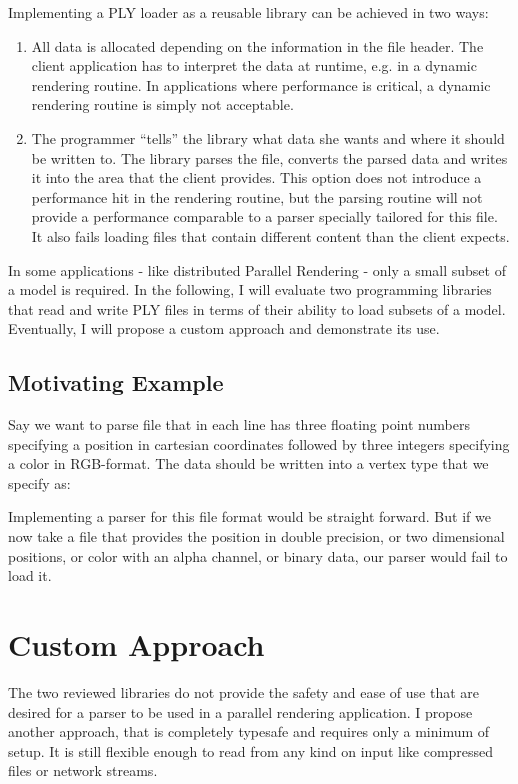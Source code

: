 \documentclass[a4paper,parskip=half,twocolumn]{scrartcl}
\begin{document}
Implementing a PLY loader as a reusable library can be achieved in two ways:
\begin{enumerate}
  \item All data is allocated depending on the information in the file header.
  The client application has to interpret the data at runtime, e.g. in a dynamic
  rendering routine. In applications where performance is critical, a dynamic
  rendering routine is simply not acceptable.
  \item The programmer ``tells'' the library what data she wants and where it
  should be written to. The library parses the file, converts the parsed data
  and writes it into the area that the client provides. This option does not
  introduce a performance hit in the rendering routine, but the parsing routine
  will not provide a performance comparable to a parser specially tailored for
  this file. It also fails loading files that contain different content than the
  client expects.
\end{enumerate}

In some applications - like distributed Parallel Rendering - only a small subset
of a model is required. In the following, I will evaluate two programming
libraries that read and write PLY files in terms of their ability to load
subsets of a model. Eventually, I will propose a custom approach and demonstrate
its use.

\subsection{Motivating Example}

Say we want to parse file that in each line has three floating point
numbers specifying a position in cartesian coordinates followed by three
integers specifying a color in RGB-format. The data should be written into a
vertex type that we specify as:


Implementing a parser for this file format would be straight forward. But if we
now take a file that provides the position in double precision, or two
dimensional positions, or color with an alpha channel, or binary data, our
parser would fail to load it.




\section{Custom Approach}

The two reviewed libraries do not provide the safety and ease of use that are
desired for a parser to be used in a parallel rendering application. I propose
another approach, that is completely typesafe and requires only a minimum of
setup. It is still flexible enough to read from any kind on input like
compressed files or network streams.
\end{document}

